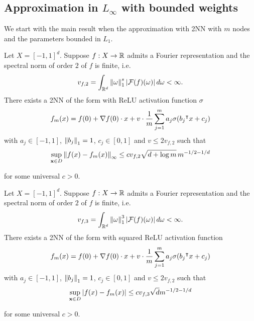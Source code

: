 \subsection{Approximation in $L_{\infty}$ with bounded weights}

We start with the main result when the approximation with 2NN with $m$ nodes and 
the parameters bounded in $L_1$.

\begin{theorem}
    \label{thm:appro_bound_l1}
    Let $X = [-1,1]^d$. Suppose $f: X \to \mathbb{R}$ admits a Fourier representation
    and the spectral norm of order $2$ of $f$ is finite, i.e.
    \begin{equation}
        v_{f,2} = \int_{\mathbb{R}^d} \left\| \omega \right\|_1^s \left| \mathcal{F}(f)(\omega) \right| 
        d\omega < \infty.
    \end{equation}
    There exists a 2NN of the form with ReLU activation function $\sigma$
    \begin{equation}
        f_m(x) = f(0) + \nabla f(0) \cdot x + v \cdot 
        \frac{1}{m} \sum_{j=1}^m a_j \sigma(b_j{}^{\intercal} x + c_j)
    \end{equation}
    with $a_j\in[-1,1]$, $\left\| b_j \right\|_1 = 1$, $c_j\in[0,1]$ and $v \leq
    2v_{f,2}$ such that
    \begin{equation}
        \sup_{\mathbf{x} \in D} \left\| f(x) - f_m(x) \right\|_{\infty} \leq c v_{f,2} \sqrt{d+\log{m}} \, m^{-1/2-1/d}
    \end{equation}

    for some universal $c > 0$.
\end{theorem}

\begin{theorem}
    Let $X = [-1,1]^d$. Suppose $f: X \to \mathbb{R}$ admits a Fourier representation
    and the spectral norm of order $2$ of $f$ is finite, i.e.
    \begin{equation}
        v_{f,3} = \int_{\mathbb{R}^d} \left\| \omega \right\|_1^3 \left| \mathcal{F}(f)(\omega) \right| 
        d\omega < \infty.
    \end{equation}
    There exists a 2NN of the form with squared ReLU activation function
    \begin{equation}
        f_m(x) = f(0) + \nabla f(0) \cdot x + v \cdot 
        \frac{1}{m} \sum_{j=1}^m a_j \sigma(b_j{}^{\intercal} x + c_j)
    \end{equation}
    with $a_j\in[-1,1]$, $\left\| b_j \right\|_1 = 1$, $c_j\in[0,1]$ and $v \leq
    2v_{f,2}$ such that
    \begin{equation}
        \sup_{\mathbf{x} \in D} \left| f(x) - f_m(x) \right| \leq 
        c v_{f,3} \sqrt{d} m^{-1/2-1/d}
    \end{equation}

    for some universal $c > 0$.
\end{theorem}

